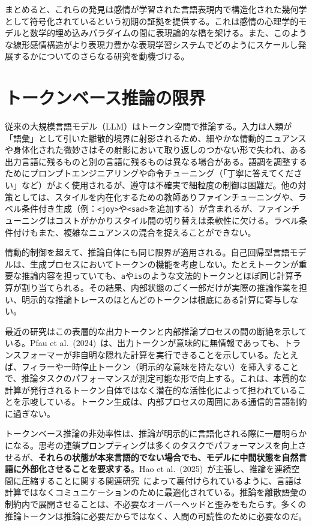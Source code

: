 まとめると、これらの発見は感情が学習された言語表現内で構造化された幾何学として符号化されているという初期の証拠を提供する。これは感情の心理学的モデルと数学的埋め込みパラダイムの間に表現論的な橋を架ける。また、このような線形感情構造がより表現力豊かな表現学習システムでどのようにスケールし発展するかについてのさらなる研究を動機づける。

\section{トークンベース推論の限界}

従来の大規模言語モデル（LLM）はトークン空間で推論する。入力は人類が「語彙」として引いた離散的境界に射影されるため、細やかな情動的ニュアンスや身体化された微妙さはその射影において取り返しのつかない形で失われ、ある出力言語に残るものと別の言語に残るものは異なる場合がある。語調を調整するためにプロンプトエンジニアリングや命令チューニング（「丁寧に答えてください」など）がよく使用されるが、遵守は不確実で細粒度の制御は困難だ。他の対策としては、スタイルを内在化するための教師ありファインチューニングや、ラベル条件付き生成（例：\texttt{<joy>}や\texttt{<sad>}を追加する）が含まれるが、ファインチューニングはコストがかかりスタイル間の切り替えは柔軟性に欠ける。ラベル条件付けもまた、複雑なニュアンスの混合を捉えることができない。

情動的制御を超えて、推論自体にも同じ限界が適用される。自己回帰型言語モデルは、生成プロセスにおいてトークンの機能を考慮しない。たとえトークンが重要な推論内容を担っていても、\texttt{a}や\texttt{is}のような文法的トークンとほぼ同じ計算予算が割り当てられる。その結果、内部状態のごく一部だけが実際の推論作業を担い、明示的な推論トレースのほとんどのトークンは根底にある計算に寄与しない。

最近の研究はこの表層的な出力トークンと内部推論プロセスの間の断絶を示している。Pfau et al.\ (2024)~\cite{pfau2024lets}は、出力トークンが意味的に無情報であっても、トランスフォーマーが非自明な隠れた計算を実行できることを示している。たとえば、フィラーや一時停止トークン（明示的な意味を持たない）を挿入することで、推論タスクのパフォーマンスが測定可能な形で向上する。これは、本質的な計算が発行されるトークン自体ではなく潜在的な活性化によって担われていることを示唆している。トークン生成は、内部プロセスの周囲にある通信的言語制約に過ぎない。

トークンベース推論の非効率性は、推論が明示的に言語化される際に一層明らかになる。思考の連鎖プロンプティングは多くのタスクでパフォーマンスを向上させるが、\textbf{それらの状態が本来言語的でない場合でも、モデルに中間状態を自然言語に外部化させることを要求する}。Hao et al.\ (2025)~\cite{hao2025traininglargelanguagemodels}が主張し、推論を連続空間に圧縮することに関する関連研究~\cite{shen2025codicompressingchainofthoughtcontinuous}によって裏付けられているように、言語は計算ではなくコミュニケーションのために最適化されている。推論を離散語彙の制約内で展開させることは、不必要なオーバーヘッドと歪みをもたらす。多くの推論トークンは推論に必要だからではなく、人間の可読性のために必要なのだ。

